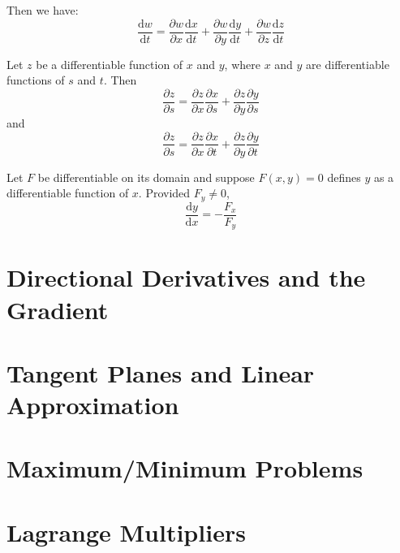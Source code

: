 \documentclass[../calc3.tex]{subfiles}
\begin{document}
Then we have:
\[\frac{\mathrm{d}w}{\mathrm{d}t}=\frac{\partial w}{\partial x}\frac{\mathrm{d}x}{\mathrm{d}t}+\frac{\partial w}{\partial y}\frac{\mathrm{d}y}{\mathrm{d}t}+\frac{\partial w}{\partial z}\frac{\mathrm{d}z}{\mathrm{d}t}\]

\begin{theorem}
    Let $z$ be a differentiable function of $x$ and $y$, where $x$ and $y$ are differentiable functions of $s$ and $t$. Then
    \[\frac{\partial z}{\partial s}=\frac{\partial z}{\partial x}\frac{\partial x}{\partial s}+\frac{\partial z}{\partial y}\frac{\partial y}{\partial s}\]
    and
    \[\frac{\partial z}{\partial s}=\frac{\partial z}{\partial x}\frac{\partial x}{\partial t}+\frac{\partial z}{\partial y}\frac{\partial y}{\partial t}\]
\end{theorem}

\begin{theorem}
    Let $F$ be differentiable on its domain and suppose $F(x,y) = 0$ defines $y$ as a 
    differentiable function of $x$. Provided $F_y\neq 0$,
    \[\frac{\mathrm{d}y}{\mathrm{d}x}=-\frac{F_x}{F_y}\]
\end{theorem}

\section{Directional Derivatives and the Gradient}
\section{Tangent Planes and Linear Approximation}
\section{Maximum/Minimum Problems}
\section{Lagrange Multipliers}
\end{document}
